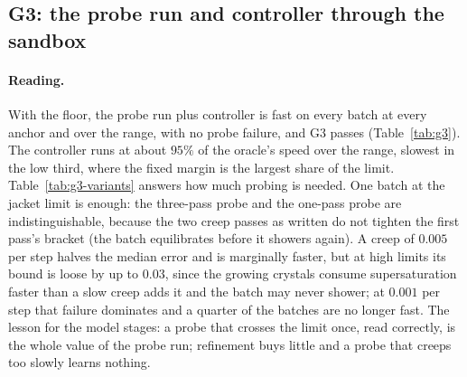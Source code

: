 \documentclass[11pt,a4paper]{article}
\newcommand{\smax}{\sigma_{\max}}
\begin{document}
\subsection{G3: the probe run and controller through the sandbox}

\begin{table}[h]
\centering\small
\resizebox{\linewidth}{!}{}
\caption{The three-pass probe and the controller through the real execution
path, at each anchor and over the range by third. Probe error is $\smax$
minus the printed lower bound.}
\label{tab:g3}
\end{table}

\begin{table}[h]
\centering\small
\resizebox{\linewidth}{!}{}
\caption{The four probe variants over the range, each followed by the same
controller.}
\label{tab:g3-variants}
\end{table}

\paragraph{Reading.} With the floor, the probe run plus controller is fast on
every batch at every anchor and over the range, with no probe failure, and
G3 passes (Table~\ref{tab:g3}). The controller runs at about $95\%$ of the
oracle's speed over the range, slowest in the low third, where the fixed
margin is the largest share of the limit. Table~\ref{tab:g3-variants} answers
how much probing is needed. One batch at the jacket limit is enough: the
three-pass probe and the one-pass probe are indistinguishable, because the
two creep passes as written do not tighten the first pass's bracket (the
batch equilibrates before it showers again). A creep of $0.005$ per step
halves the median error and is marginally faster, but at high limits its
bound is loose by up to $0.03$, since the growing crystals consume
supersaturation faster than a slow creep adds it and the batch may never
shower; at $0.001$ per step that failure dominates and a quarter of the
batches are no longer fast. The lesson for the model stages: a probe that
crosses the limit once, read correctly, is the whole value of the probe
run; refinement buys little and a probe that creeps too slowly learns
nothing.
\end{document}
